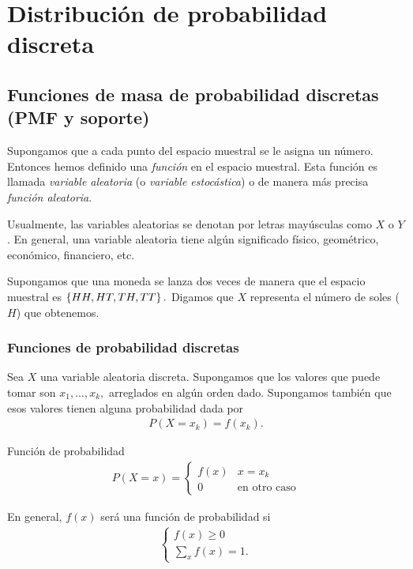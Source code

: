 
\section{Distribución de probabilidad discreta}

\subsection{Funciones de masa de probabilidad discretas (PMF y soporte)}

Supongamos que a cada punto del espacio muestral se le asigna un número.  Entonces hemos definido una \emph{función} en el espacio muestral.  Esta función es llamada \emph{variable aleatoria} (o \emph{variable estocástica}) o de manera más precisa \emph{función aleatoria}. 


Usualmente, las variables aleatorias se denotan por letras mayúsculas como $X$ o $Y$. En general, una variable aleatoria tiene algún significado físico, geométrico, económico, financiero, etc.



\begin{ejemplo}
	\label{exmp:2.6.1}
	Supongamos que una moneda se lanza dos veces de manera que el espacio muestral es $\left\{ HH,HT,TH,TT \right\}.$  Digamos que $X$ representa el número de soles ($H$) que obtenemos.
\end{ejemplo}


\subsubsection{Funciones de probabilidad discretas}

Sea $X$ una variable aleatoria discreta.  Supongamos que los valores que puede tomar son $x_{1},...,x_{k},$ arreglados en algún orden dado.  Supongamos también que esos valores
tienen alguna probabilidad dada por
\begin{align}
	\label{eq:2.6.1}
	P(X=x_{k})=f(x_{k}).
\end{align}


{Función de probabilidad}
\begin{align}
	\label{2.2}
	P(X=x)=
	\begin{cases}
		f(x) & x=x_{k} \\
		0	& \text{en otro caso}
	\end{cases}
\end{align}



En general, $f(x)$ será una función de probabilidad si
\begin{align}
	\begin{cases}
		f(x)\geq 0 \\
		\sum_{x}f(x)=1.
	\end{cases}
\end{align}



